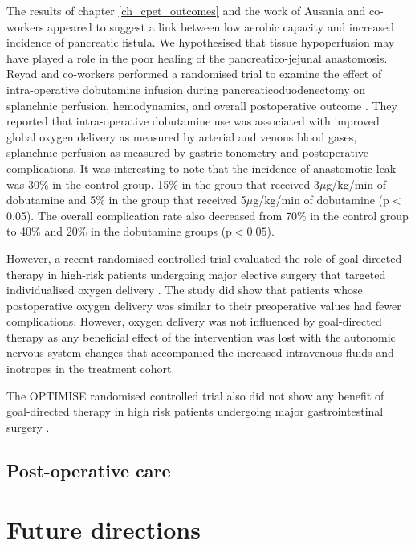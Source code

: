 The results of chapter \ref{ch_cpet_outcomes} and the work of Ausania and co-workers appeared to suggest a link between low aerobic capacity and increased incidence of pancreatic fistula. We hypothesised that tissue hypoperfusion may have played a role in the poor healing of the pancreatico-jejunal anastomosis. 
Reyad and co-workers performed a randomised trial to examine the effect of intra-operative dobutamine infusion during pancreaticoduodenectomy on splanchnic perfusion, hemodynamics, and overall postoperative outcome \parencite{reyad_effect_2013}. 
They reported that intra-operative dobutamine use was associated with improved global oxygen delivery as measured by arterial and venous blood gases, splanchnic perfusion as measured by gastric tonometry and postoperative complications.
It was interesting to note that the incidence of anastomotic leak was 30\% in the control group, 15\% in the group that received 3$\mu$g/kg/min of dobutamine and 5\% in the group that received 5$\mu$g/kg/min of dobutamine (p$<$0.05). The overall complication rate also decreased from 70\% in the control group to 40\% and 20\% in the dobutamine groups (p$<0.05$).

However, a recent randomised controlled trial evaluated the role of goal-directed therapy in high-risk patients undergoing major elective surgery that targeted individualised oxygen delivery \parencite{ackland_individualised_2015}.
The study did show that patients whose postoperative oxygen delivery was similar to their preoperative values had fewer complications.
However, oxygen delivery was not influenced by goal-directed therapy as any beneficial effect of the intervention was lost with the autonomic nervous system changes that accompanied the increased intravenous fluids and inotropes in the treatment cohort.

The OPTIMISE randomised controlled trial also did not show any benefit of goal-directed therapy in high risk patients undergoing major gastrointestinal surgery \parencite{pearse_effect_2014}.








\subsection{Post-operative care}


\section{Future directions}


